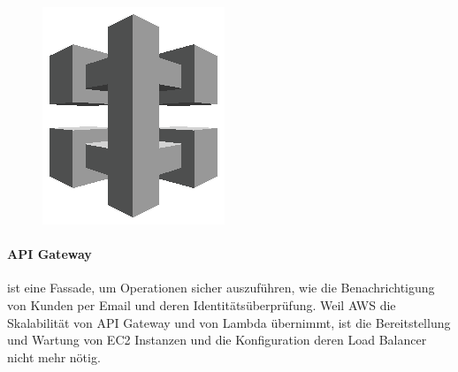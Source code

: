 \documentclass[
12pt,
english,
ngerman,
headsepline,
twoside,
openright,
numbers=noenddot,version=first
]{scrreprt}
\begin{document}
\begin{figure}
	\includegraphics[width=0.9\linewidth]{./pics/aws/MobileServices_GRAYSCALE_AmazonAPIGateway.eps}
\end{figure}
\paragraph{API Gateway} ist eine Fassade, um Operationen sicher auszuführen, wie die Benachrichtigung von Kunden per Email und deren Identitätsüberprüfung. Weil AWS die Skalabilität von API Gateway und von Lambda übernimmt, ist die Bereitstellung und Wartung von EC2 Instanzen und die Konfiguration deren Load Balancer nicht mehr nötig. 
\end{document}
